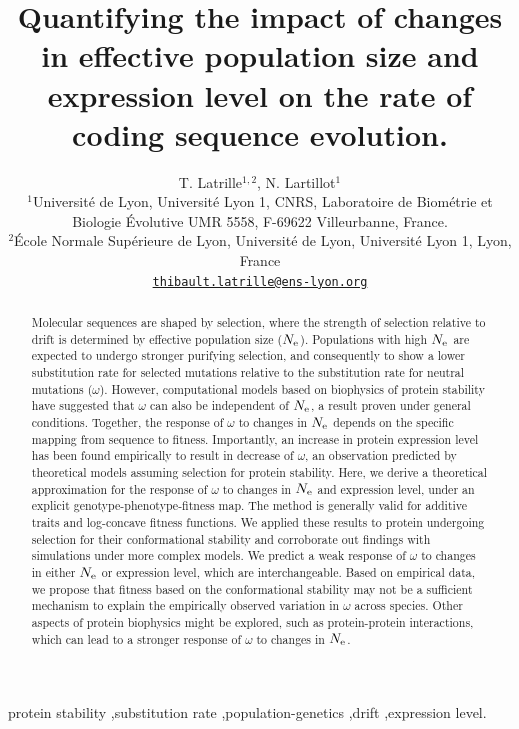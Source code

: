 \documentclass[authoryear]{elsarticle} %
\title{Quantifying the impact of changes in effective population size and expression level on the rate of coding sequence evolution.}
\author{
    \large
    T. {Latrille}$^{1,2}$, N. {Lartillot}$^{1}$ \\
    \normalsize
	$^{1}$Université de Lyon, Université Lyon 1, CNRS, Laboratoire de Biométrie et Biologie Évolutive UMR 5558, F-69622 Villeurbanne, France.\\
	$^{2}$École Normale Supérieure de Lyon, Université de Lyon, Université Lyon 1, Lyon, France\\
	\texttt{\href{mailto:thibault.latrille@ens-lyon.org}{thibault.latrille@ens-lyon.org}} \\
}
\begin{document}
\begin{frontmatter}

\begin{abstract}
Molecular sequences are shaped by selection, where the strength of selection relative to drift is determined by effective population size ($N_{\text{e}}$).
Populations with high $N_{\text{e}}$ are expected to undergo stronger purifying selection, and consequently to show a lower substitution rate for selected mutations relative to the substitution rate for neutral mutations ($\omega$).
However, computational models based on biophysics of protein stability have suggested that $\omega$ can also be independent of $N_{\text{e}}$, a result proven under general conditions.
Together, the response of $\omega$ to changes in $N_{\text{e}}$ depends on the specific mapping from sequence to fitness.
Importantly, an increase in protein expression level has been found empirically to result in decrease of $\omega$, an observation predicted by theoretical models assuming selection for protein stability.
Here, we derive a theoretical approximation for the response of $\omega$ to changes in $N_{\text{e}}$ and expression level, under an explicit genotype-phenotype-fitness map.
The method is generally valid for additive traits and log-concave fitness functions.
We applied these results to protein undergoing selection for their conformational stability and corroborate out findings with simulations under more complex models.
We predict a weak response of $\omega$ to changes in either $N_{\text{e}}$ or expression level, which are interchangeable.
Based on empirical data, we propose that fitness based on the conformational stability may not be a sufficient mechanism to explain the empirically observed variation in $\omega$ across species.
Other aspects of protein biophysics might be explored, such as protein-protein interactions, which can lead to a stronger response of $\omega$ to changes in $N_{\text{e}}$.
\end{abstract}

\begin{keyword}
	protein stability \sep substitution rate \sep population-genetics \sep drift \sep expression level.
\end{keyword}

\end{frontmatter}

\linenumbers
\end{document}
